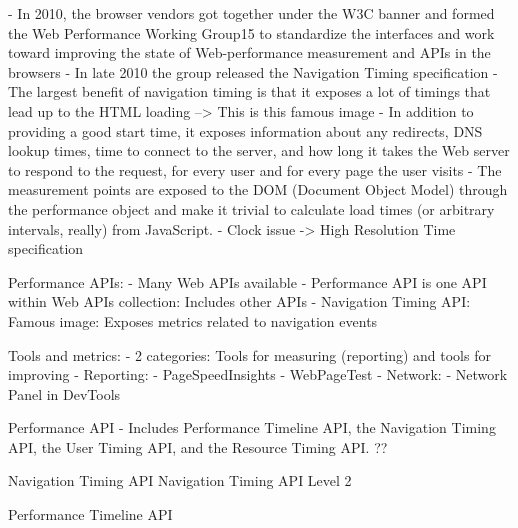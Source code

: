 


- In 2010, the browser vendors got together under the W3C banner and formed the Web Performance Working Group15 to standardize the interfaces and work toward improving the state of Web-performance measurement and APIs in the browsers
- In late 2010 the group released the Navigation Timing specification
- The largest benefit of navigation timing is that it exposes a lot of timings that lead up to the HTML loading --> This is this famous image
- In addition to providing a good start time, it exposes information about any redirects, DNS lookup times, time to connect to the server, and how long it takes the Web server to respond to the request, for every user and for every page the user visits
- The measurement points are exposed to the DOM (Document Object Model) through the performance object and make it trivial to calculate load times (or arbitrary intervals, really) from JavaScript.
- Clock issue -> High Resolution Time specification



Performance APIs:
- Many Web APIs available %
- Performance API is one API within Web APIs collection: Includes other APIs
- Navigation Timing API: Famous image: Exposes metrics related to navigation events

Tools and metrics:
- 2 categories: Tools for measuring (reporting) and tools for improving
- Reporting:
- PageSpeedInsights
- WebPageTest
- Network:
- Network Panel in DevTools





Performance API %
- Includes Performance Timeline API, the Navigation Timing API, the User Timing API, and the Resource Timing API.  ??



Navigation Timing API %
Navigation Timing API Level 2 %






Performance Timeline API %





